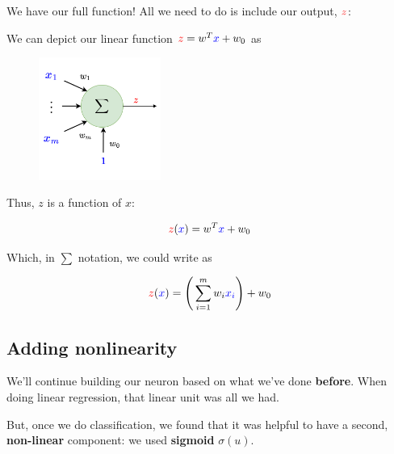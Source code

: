         We have our full function! All we need to do is include our output, $\textcolor{red}{z}$:\\
        
        \begin{notation}
            We can depict our linear function $\textcolor{red}{z} = w^T\textcolor{blue}{x}+w_0$ as
            \begin{figure}[H]
            \centering
            \includegraphics[width=40mm,scale=0.4]{images/nn_images/linear_subunit.png}
        \end{figure}
        \end{notation}
        
        Thus, $z$ is a function of $x$:
        
        \begin{equation}
            \textcolor{red}{z}(\textcolor{blue}{x}) = w^T\textcolor{blue}{x}+w_0
        \end{equation}
        
        Which, in $\sum$ notation, we could write as
        
        \begin{equation}
            \textcolor{red}{z}(\textcolor{blue}{x}) = \Bigg( \sum_{i=1}^m w_i\textcolor{blue}{x_i} \Bigg) +w_0
        \end{equation}
        
    \subsection{Adding nonlinearity}
    
        We'll continue building our neuron based on what we've done \textbf{before}. When doing linear regression, that linear unit was all we had. 
        
        But, once we do classification, we found that it was helpful to have a second, \textbf{non-linear} component: we used \textbf{sigmoid} $\sigma(u)$.

